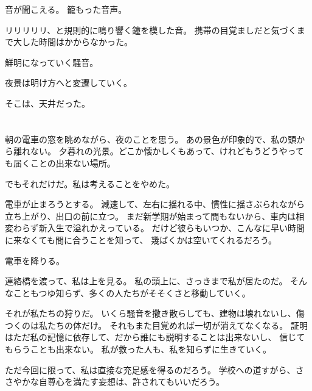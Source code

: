 \documentclass[../IHMain]{subfiles}
\begin{document}
音が聞こえる。
籠もった音声。

リリリリリ、と規則的に鳴り響く鐘を模した音。
携帯の目覚ましだと気づくまで大した時間はかからなかった。

鮮明になっていく騒音。

夜景は明け方へと変遷していく。

そこは、天井だった。

\section{}
朝の電車の窓を眺めながら、夜のことを思う。
あの景色が印象的で、私の頭から離れない。
夕暮れの光景。どこか懐かしくもあって、けれどもうどうやっても届くことの出来ない場所。

でもそれだけだ。私は考えることをやめた。

電車が止まろうとする。
減速して、左右に揺れる中、慣性に揺さぶられながら立ち上がり、出口の前に立つ。
まだ新学期が始まって間もないから、車内は相変わらず新入生で溢れかえっている。
だけど彼らもいつか、こんなに早い時間に来なくても間に合うことを知って、
幾ばくかは空いてくれるだろう。

電車を降りる。

連絡橋を渡って、私は上を見る。
私の頭上に、さっきまで私が居たのだ。
そんなこともつゆ知らず、多くの人たちがそそくさと移動していく。

それが私たちの狩りだ。
いくら騒音を撒き散らしても、建物は壊れないし、傷つくのは私たちの体だけ。
それもまた目覚めれば一切が消えてなくなる。
証明はただ私の記憶に依存して、だから誰にも説明することは出来ないし、
信じてもらうことも出来ない。
私が救った人も、私を知らずに生きていく。

ただ今回に限って、私は直接な充足感を得るのだろう。
学校への道すがら、ささやかな自尊心を満たす妄想は、許されてもいいだろう。
\end{document}
